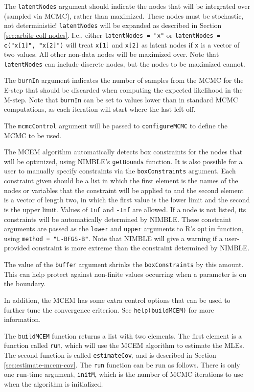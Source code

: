 \documentclass[12pt,oneside]{book}\usepackage[]{graphicx}\usepackage[]{color}
\def\cd#1{\texttt{#1}}
\begin{document}
 
  The \cd{latentNodes} argument should indicate the nodes that will be
  integrated over (sampled via MCMC), rather than
  maximized.  These
  nodes must be stochastic, not deterministic! \cd{latentNodes} will
  be expanded as described in Section \ref{sec:arbitr-coll-nodes}. I.e.,
  either \cd{latentNodes = "x"} or \cd{latentNodes = c("x[1]",
    "x[2]")} will treat \cd{x[1]} and \cd{x[2]} as latent nodes if
  \cd{x} is a vector of two values. All other non-data nodes will be
  maximized over. Note that \cd{latentNodes} can include discrete nodes,
  but the nodes to be maximized cannot.  

 The \cd{burnIn} argument indicates the number of samples from the MCMC for the E-step that should be discarded when computing the expected likelihood in the M-step. Note that \cd{burnIn} can be set to values lower than in standard MCMC computations, as each iteration will start where the last left off. 
  
The  \cd{mcmcControl} argument will be passed to \cd{configureMCMC} to define the MCMC to be used.

 The MCEM algorithm automatically detects box constraints for the nodes that will
 be optimized, using NIMBLE's \cd{getBounds} function.  It is also possible for a user to manually specify constraints via the \cd{boxConstraints} argument.
 Each constraint given should be a list
 in which the first element is the names of the nodes or variables
 that the constraint will be applied to and the second element is a
 vector of length two, in which the first value is the lower limit and
 the second is the upper limit.  Values of \cd{Inf} and \cd{-Inf} are allowed. If a node is not listed, its constraints will be automatically determined by NIMBLE. These constraint arguments are passed as the \cd{lower} and \cd{upper} arguments to R's \cd{optim} function, using \cd{method = "L-BFGS-B"}.  Note that NIMBLE will give a warning if a user-provided constraint is more extreme than the constraint determined by NIMBLE.   

 The value of the  \cd{buffer} argument shrinks the
 \cd{boxConstraints} by this amount.  This can help protect against
 non-finite values occurring when a parameter is on the boundary.
  
  In addition, the MCEM has some extra control options that can be used to further tune the convergence criterion.  See \cd{help(buildMCEM)} for more information.  
  
The \cd{buildMCEM} function returns a list with two elements.  The first element is a function called \cd{run}, which will use the MCEM algorithm to estimate the MLEs.  The second function is called \cd{estimateCov}, and is described in Section \ref{sec:estimate-mcem-cov}.  The \cd{run} function can be run as follows. There is only one run-time argument, \cd{initM}, which is the number of MCMC iterations to use when the algorithm is initialized.
\end{document}
